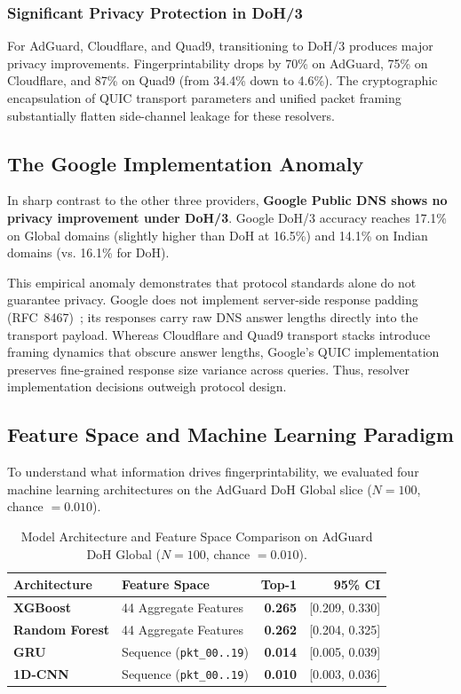 \documentclass[conference,10pt]{IEEEtran}
\begin{document}
\subsubsection{Significant Privacy Protection in DoH/3} For AdGuard, Cloudflare, and Quad9, transitioning to DoH/3 produces major privacy improvements. Fingerprintability drops by 70\% on AdGuard, 75\% on Cloudflare, and 87\% on Quad9 (from 34.4\% down to 4.6\%). The cryptographic encapsulation of QUIC transport parameters and unified packet framing substantially flatten side-channel leakage for these resolvers.

\subsection{The Google Implementation Anomaly}
In sharp contrast to the other three providers, \textbf{Google Public DNS shows no privacy improvement under DoH/3}. Google DoH/3 accuracy reaches 17.1\% on Global domains (slightly higher than DoH at 16.5\%) and 14.1\% on Indian domains (vs. 16.1\% for DoH). 

This empirical anomaly demonstrates that protocol standards alone do not guarantee privacy. Google does not implement server-side response padding (RFC~8467)~\cite{rfc8467}; its responses carry raw DNS answer lengths directly into the transport payload. Whereas Cloudflare and Quad9 transport stacks introduce framing dynamics that obscure answer lengths, Google's QUIC implementation preserves fine-grained response size variance across queries. Thus, resolver implementation decisions outweigh protocol design.

\subsection{Feature Space and Machine Learning Paradigm}
To understand what information drives fingerprintability, we evaluated four machine learning architectures on the AdGuard DoH Global slice ($N=100$, chance $= 0.010$).

\begin{table}[t]
\centering
\caption{Model Architecture and Feature Space Comparison on AdGuard DoH Global ($N=100$, chance $= 0.010$).}
\label{tab:model_comparison}
\footnotesize
\setlength{\tabcolsep}{2.5pt}
\begin{tabular}{llrr}
\toprule
\textbf{Architecture} & \textbf{Feature Space} & \textbf{Top-1} & \textbf{95\% CI} \\
\midrule
\textbf{XGBoost}      & 44 Aggregate Features  & \textbf{0.265} & [0.209, 0.330] \\
\textbf{Random Forest}& 44 Aggregate Features  & \textbf{0.262} & [0.204, 0.325] \\
\textbf{GRU}          & Sequence (\texttt{pkt\_00..19}) & \textbf{0.014} & [0.005, 0.039] \\
\textbf{1D-CNN}       & Sequence (\texttt{pkt\_00..19}) & \textbf{0.010} & [0.003, 0.036] \\
\bottomrule
\end{tabular}
\end{table}
\end{document}
